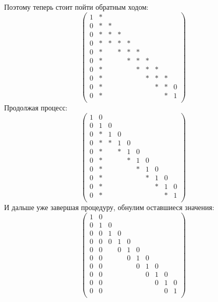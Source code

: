 \documentclass[11pt,a4paper,twoside]{report}
\begin{document}
Поэтому теперь стоит пойти обратным ходом: \[
\begin{pmatrix}
1 & * &  &  &  &  &  &  &  &  \\
0 & * & * &  &  &  &  &  &  &   \\
0 & * & * & * &  &  &  &  &  &   \\
0 & * & * & * & * &  &  &  &  &  \\
0 & * &  & * & * & * &  &  &  &  \\
0 & * &  &  & * & * & * &  &  &  \\
0 & * &  &  &  & * & * & * &  &  \\
0 & * &  &  &  &  & * & * & * &  \\
0 & * &  &  &  &  &  & * & * & 0 \\
0 & * &  &  &  &  &  &  & * & 1  \\
\end{pmatrix}
\] Продолжая процесс: \[
\begin{pmatrix}
1 & 0 &  &  &  &  &  &  &  &  \\
0 & 1 & 0 &  &  &  &  &  &  &   \\
0 & * & 1 & 0 &  &  &  &  &  &   \\
0 & * & * & 1 & 0 &  &  &  &  &  \\
0 & * &  & * & 1 & 0 &  &  &  &  \\
0 & * &  &  & * & 1 & 0 &  &  &  \\
0 & * &  &  &  & * & 1 & 0 &  &  \\
0 & * &  &  &  &  & * & 1 & 0 &  \\
0 & * &  &  &  &  &  & * & 1 & 0 \\
0 & * &  &  &  &  &  &  & * & 1  \\
\end{pmatrix}
\] И дальше уже завершая процедуру, обнулим оставшиеся значения: \[
\begin{pmatrix}
1 & 0 &  &  &  &  &  &  &  &  \\
0 & 1 & 0 &  &  &  &  &  &  &   \\
0 & 0 & 1 & 0 &  &  &  &  &  &   \\
0 & 0 & 0 & 1 & 0 &  &  &  &  &  \\
0 & 0 &  & 0 & 1 & 0 &  &  &  &  \\
0 & 0 &  &  & 0 & 1 & 0 &  &  &  \\
0 & 0 &  &  &  & 0 & 1 & 0 &  &  \\
0 & 0 &  &  &  &  & 0 & 1 & 0 &  \\
0 & 0 &  &  &  &  &  & 0 & 1 & 0 \\
0 & 0 &  &  &  &  &  &  & 0 & 1  \\
\end{pmatrix}
\]
\end{document}
